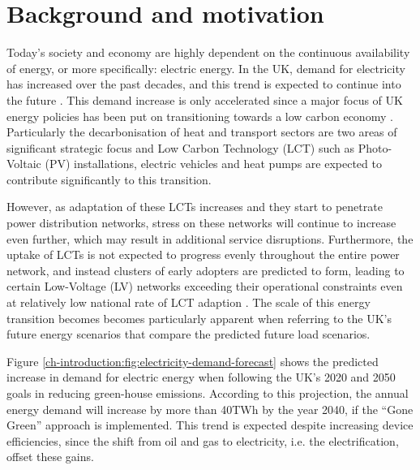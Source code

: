 \section{Background and motivation}
\label{ch-introduction:sec:background}

Today's society and economy are highly dependent on the continuous availability of energy, or more specifically: electric energy.
In the UK, demand for electricity has increased over the past decades, and this trend is expected to continue into the future \cite{HMGovernment2009}.
This demand increase is only accelerated since a major focus of UK energy policies has been put on transitioning towards a low carbon economy \cite{RoyalAcademyofEngineering2010}.
Particularly the decarbonisation of heat and transport sectors are two areas of significant strategic focus and Low Carbon Technology (LCT) such as Photo-Voltaic (PV) installations, electric vehicles and heat pumps are expected to contribute significantly to this transition.

However, as adaptation of these LCTs increases and they start to penetrate power distribution networks, stress on these networks will continue to increase even further, which may result in additional service disruptions.
Furthermore, the uptake of LCTs is not expected to progress evenly throughout the entire power network, and instead clusters of early adopters are predicted to form, leading to certain Low-Voltage (LV) networks exceeding their operational constraints even at relatively low national rate of LCT adaption \cite{Poghosyan2014}.
The scale of this energy transition becomes becomes particularly apparent when referring to the UK's future energy scenarios that compare the predicted future load scenarios.



Figure \ref{ch-introduction:fig:electricity-demand-forecast} shows the predicted increase in demand for electric energy when following the UK's 2020 and 2050 goals in reducing green-house emissions.
According to this projection, the annual energy demand will increase by more than 40TWh by the year 2040, if the ``Gone Green'' approach is implemented.
This trend is expected despite increasing device efficiencies, since the shift from oil and gas to electricity, i.e. the electrification, offset these gains.




